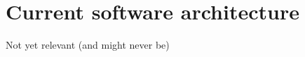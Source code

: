 \chapter{Current software architecture}
\label{sec:Current software architecture}
Not yet relevant (and might never be)